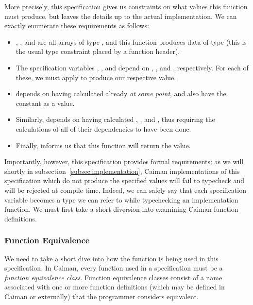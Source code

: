 More precisely, this specification gives us constraints on what values this function must produce, but leaves the details up to the actual implementation.  We can exactly enumerate these requirements as follows:
%
\begin{itemize}
\item {}, , and  are all arrays of type , and this function produces data of type  (this is the usual type constraint placed by a function header).
\item The specification variables , , and  depend on , , and , respectively.  For each of these, we must apply  to produce our respective value.
\item {} depends on having calculated  already \textit{at some point}, and also have the constant  as a value.
\item Similarly,  depends on having calculated , , and , thus requiring the calculations of all of their dependencies to have been done.
\item Finally,  informs us that this function will return the  value.
\end{itemize}
%
Importantly, however, this specification provides formal requirements; as we will shortly in subsection~\ref{subsec:implementation}, Caiman implementations of this specification which do not produce the specified values will fail to typecheck and will be rejected at compile time.  Indeed, we can safely say that each specification variable becomes a type we can refer to while typechecking an implementation function.  We must first take a short diversion into examining Caiman function definitions.

\subsubsection{Function Equivalence}
\label{subsec:equivalence}

We need to take a short dive into how the  function is being used in this  specification.  In Caiman, every function used in a specification must be a \textit{function equivalence class}.  Function equivalence classes consist of a name associated with one or more function definitions (which may be defined in Caiman or externally) that the programmer considers equivalent.


